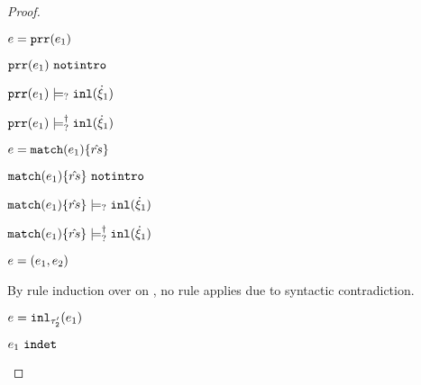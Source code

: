 \begin{proof}
\begin{byCases}
\begin{byCases}
\begin{pfsteps*}
        \end{pfsteps*} 
        \item[\text{(\ref{rule:IPrr})}]
        \begin{pfsteps*}
        \item $e=\mathtt{prr}(e_1)$ 
        \item $\mathtt{prr}(e_1) ~\mathtt{notintro}$  
        \item $\mathtt{prr}(e_1) \models_{?} \mathtt{inl}(\dot{\xi}_1)$  
        \item $\mathtt{prr}(e_1) \models_{?}^{\dag} \mathtt{inl}(\dot{\xi}_1)$ 
        \end{pfsteps*} 
        \item[\text{(\ref{rule:IMatch})}]
        \begin{pfsteps*}
        \item $e=\mathtt{match}(e_1) \{\hat{rs}\}$ 
        \item $\mathtt{match}(e_1) \{\hat{rs}\} ~\mathtt{notintro}$  
        \item $\mathtt{match}(e_1) \{\hat{rs}\} \models_{?} \mathtt{inl}(\dot{\xi}_1)$  
        \item $\mathtt{match}(e_1) \{\hat{rs}\} \models_{?}^{\dag} \mathtt{inl}(\dot{\xi}_1)$ 
        \end{pfsteps*} 
        \item[\text{(\ref{rule:IPairL}), (\ref{rule:IPairR}), (\ref{rule:IPair})}] 
        \begin{pfsteps*}
        \item $e=(e_1 , e_2)$ 
        \end{pfsteps*} 
        By rule induction over  on , no rule applies due to syntactic contradiction.
        \item[\text{(\ref{rule:IInl})}] 
        \begin{pfsteps*}
        \item $e=\mathtt{inl}_{\tau_2'}({e_1})$ 
        \item $e_1 ~\mathtt{indet}$  

\end{pfsteps*}
\end{byCases}
\end{byCases}
\end{proof}
